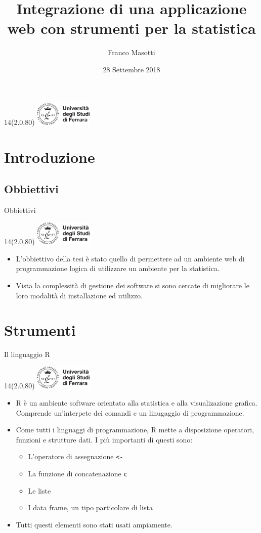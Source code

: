 \documentclass[11pt,xcolor={dvipsnames},default]{beamer} %
\title[Integrazione applicazione web]{Integrazione di una applicazione web con strumenti per la statistica}
\author[Franco Masotti]
{Franco Masotti}
\institute[Institute Name]
{
  Università degli studi di Ferrara \\
  Dipartimento di Matematica e Informatica \\[0.5Cm]
  Relatore\\ Prof. \textbf{Fabrizio Riguzzi}\\[0.25Cm]
  }
\date{28 Settembre 2018}
\newcommand{\MyLogo}{%
\begin{textblock}{14}(2.0,80)
 \includegraphics[height=1.15cm, angle=0]{logo}
\end{textblock}
}
\begin{document}

\begin{frame}
\transdissolve
\MyLogo
\begin{center}
  \titlepage
\end{center}
\end{frame}



\section{Introduzione}
\subsection{Obbiettivi}
\begin{frame}{Obbiettivi}
\transboxin
\MyLogo
\begin{itemize}
\item L'obbiettivo della tesi è stato quello di permettere ad un ambiente web
di programmazione logica di utilizzare un ambiente per la statistica.
\item Vista la complessità di gestione dei software si sono cercate di 
migliorare le loro modalità di installazione ed utilizzo.
\end{itemize}
\end{frame}

\section{Strumenti}
\begin{frame}{Il linguaggio R}
\transboxin
\MyLogo
\begin{itemize}
\item R è un ambiente software orientato alla statistica e alla visualizazione 
grafica. Comprende un'interpete dei comandi e un linugaggio di programmazione.
\item Come tutti i linguaggi di programmazione, R mette a disposizione 
operatori, funzioni e strutture dati. I più importanti di questi sono:
\begin{itemize}
\item L'operatore di assegnazione \texttt{<-}
\item La funzione di concatenazione \texttt{c}
\item Le liste
\item I data frame, un tipo particolare di lista
\end{itemize}
\item Tutti questi elementi sono stati usati ampiamente.
\end{itemize}
\end{frame}
\end{document}
